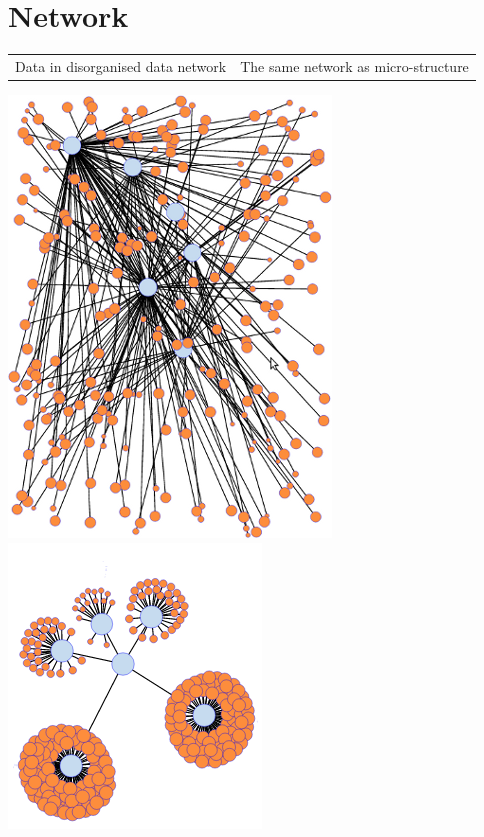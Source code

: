 \documentclass[15pt]{article}
\begin{document}
\section{Network}
    
   \begin{tabular}{cc}
    Data in disorganised data network           &    The same network as micro-structure\\
    
    \end{tabular}




\includegraphics[scale=0.5]{img/normal-knowledge.png}
\includegraphics[scale=0.9]{img/micro-structure.png}


\vskip 0.4cm
\end{document}
